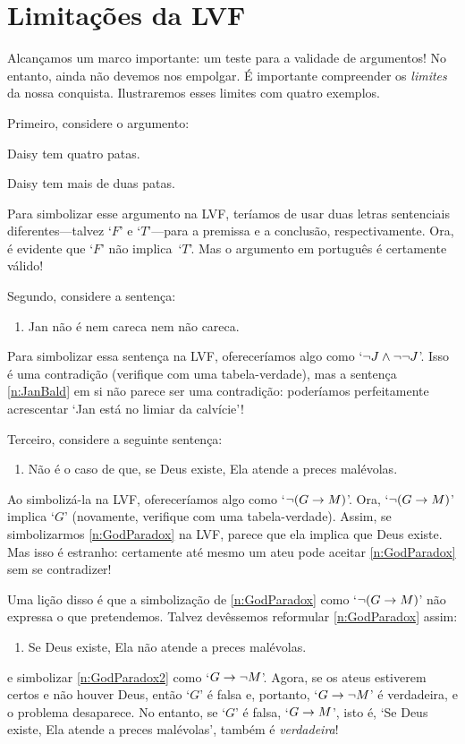 \chapter{Limitações da LVF}\label{s:ParadoxesOfMaterialConditional}

Alcançamos um marco importante: um teste para a validade de
argumentos! No entanto, ainda não devemos nos empolgar. É importante
compreender os \emph{limites} da nossa conquista. Ilustraremos esses
limites com quatro exemplos.

Primeiro, considere o argumento:
	\begin{earg}
		\item Daisy tem quatro patas.
		\item[\texttherefore] Daisy tem mais de duas patas.
	\end{earg}
Para simbolizar esse argumento na LVF, teríamos de usar duas letras
sentenciais diferentes---talvez `$F$' e `$T$'---para a premissa e a
conclusão, respectivamente. Ora, é evidente que `$F$' não implica~`$T$'.
Mas o argumento em português é certamente válido!

Segundo, considere a sentença:
	\begin{enumerate}
		\item\label{n:JanBald} Jan não é nem careca nem não careca.
	\end{enumerate}
Para simbolizar essa sentença na LVF, ofereceríamos algo como
`$\neg J \wedge \neg \neg J$'. Isso é uma contradição (verifique com
uma tabela-verdade), mas a sentença \cref*{n:JanBald} em si não parece
ser uma contradição: poderíamos perfeitamente acrescentar `Jan está no
limiar da calvície'!

Terceiro, considere a seguinte sentença:
	\begin{enumerate}
	\item\label{n:GodParadox} Não é o caso de que, se Deus existe, Ela atende a preces malévolas.
	\end{enumerate}
Ao simbolizá-la na LVF, ofereceríamos algo como `$\neg (G \rightarrow M)$'.
Ora, `$\neg (G \rightarrow M)$' implica `$G$' (novamente, verifique com uma
tabela-verdade). Assim, se simbolizarmos \cref*{n:GodParadox} na LVF,
parece que ela implica que Deus existe. Mas isso é estranho: certamente
até mesmo um ateu pode aceitar \cref*{n:GodParadox} sem se contradizer!

Uma lição disso é que a simbolização de \cref*{n:GodParadox} como
`$\neg(G \rightarrow M)$' não expressa o que pretendemos. Talvez devêssemos
reformular \cref*{n:GodParadox} assim:
	\begin{enumerate}
	\item\label{n:GodParadox2} Se Deus existe, Ela não atende a preces malévolas.
	\end{enumerate}
e simbolizar \cref*{n:GodParadox2} como `$G \rightarrow \neg M$'. Agora, se os
ateus estiverem certos e não houver Deus, então `$G$' é falsa e, portanto,
`$G \rightarrow \neg M$' é verdadeira, e o problema desaparece. No entanto,
se `$G$' é falsa, `$G \rightarrow M$', isto é, `Se Deus existe, Ela atende a
preces malévolas', também é \emph{verdadeira}!

